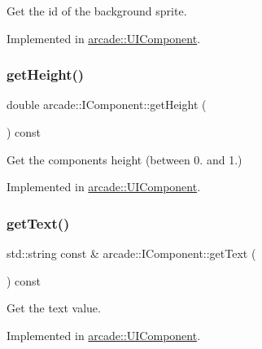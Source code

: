 Get the id of the background sprite. 



Implemented in \hyperlink{classarcade_1_1_u_i_component_a7da87b1ce3bc56dcc6600e1c27e325a6}{arcade\+::\+U\+I\+Component}.

\mbox{\label{classarcade_1_1_i_component_a77a3bed39227f11d06bb71e06ee2ee30}} 
\subsubsection{\texorpdfstring{get\+Height()}{getHeight()}}
{\footnotesize\ttfamily double arcade\+::\+I\+Component\+::get\+Height (\begin{DoxyParamCaption}{ }\end{DoxyParamCaption}) const\hspace{0.3cm}{\ttfamily [pure virtual]}}



Get the component\textquotesingle{}s height (between 0. and 1.) 



Implemented in \hyperlink{classarcade_1_1_u_i_component_abb02d0b9324eabf8ddf0d1302a0b08f7}{arcade\+::\+U\+I\+Component}.

\mbox{\label{classarcade_1_1_i_component_a7c09ef60e3d41d4afedf2be77fe880a7}} 
\subsubsection{\texorpdfstring{get\+Text()}{getText()}}
{\footnotesize\ttfamily std\+::string const  \& arcade\+::\+I\+Component\+::get\+Text (\begin{DoxyParamCaption}{ }\end{DoxyParamCaption}) const\hspace{0.3cm}{\ttfamily [pure virtual]}}



Get the text value. 



Implemented in \hyperlink{classarcade_1_1_u_i_component_aa930897f9456ed9462063481d19d10ed}{arcade\+::\+U\+I\+Component}.

